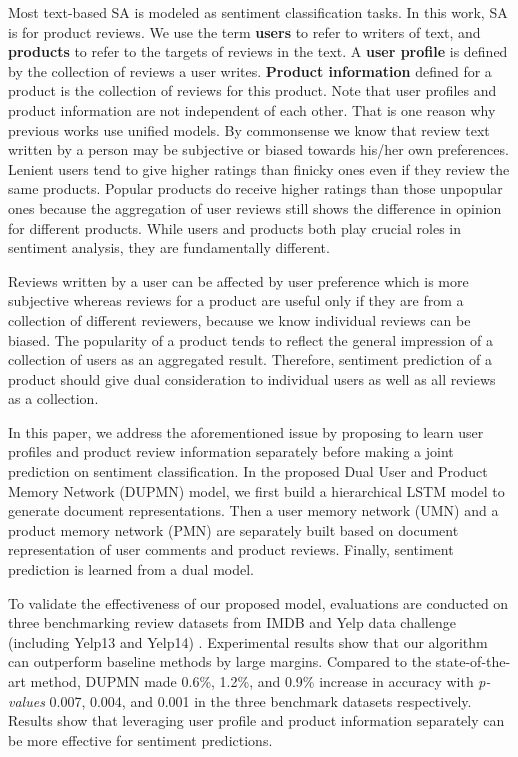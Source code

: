 \documentclass[11pt,a4paper]{article}
\begin{document}
Most text-based SA is modeled as sentiment classification tasks. In this work, SA is for product reviews. We use the term \textbf{users} to refer to writers of text, and \textbf{products} to refer to the targets of reviews in the text. A \textbf{user profile} is defined by the collection of reviews a user writes. \textbf{Product information} defined for a product is the collection of reviews for this product. Note that user profiles and product information are not independent of each other. That is one reason why previous works use unified models. By commonsense we know that review text written by a person may be subjective or biased towards his/her own preferences. Lenient users tend to give higher ratings than finicky ones even if they review the same products. Popular products do receive higher ratings than those unpopular ones because the aggregation of user reviews still shows the difference in opinion for different products. While users and products both play crucial roles in sentiment analysis, they are fundamentally different. 

Reviews written by a user can be affected by user preference which is more subjective whereas reviews for a product are useful only if they are from a collection of different reviewers, because we know individual reviews can be biased. The popularity of a product tends to reflect the general impression of a collection of users as an aggregated result. Therefore, sentiment prediction of a product should give dual consideration to individual users as well as all reviews as a collection.

In this paper, we address the aforementioned issue by proposing to learn user profiles and product review information separately before making a joint prediction on sentiment classification. In the proposed Dual User and Product Memory Network (DUPMN) model, we first build a hierarchical LSTM \cite{hochreiter1997long} model to generate document representations. Then a user memory network (UMN) and a product memory network (PMN) are separately built based on document representation of user comments and product reviews. Finally, sentiment prediction is learned from a dual model.

To validate the effectiveness of our proposed model, evaluations are conducted on three benchmarking review datasets from IMDB and Yelp data challenge (including Yelp13 and Yelp14) \cite{tang2015document}. Experimental results show that our algorithm can outperform baseline methods by large margins. Compared to the state-of-the-art method, DUPMN made 0.6\%, 1.2\%, and  0.9\% increase in accuracy with \textit{p-values} 0.007, 0.004, and 0.001 in the three benchmark datasets respectively. Results show that leveraging user profile and product information separately can be more effective for sentiment predictions.
\end{document}
